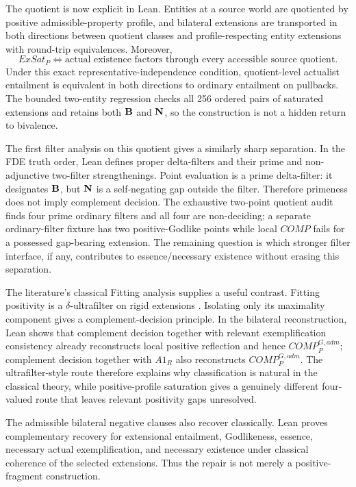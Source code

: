 The quotient is now explicit in Lean. Entities at a source world are quotiented by positive admissible-property profile, and bilateral extensions are transported in both directions between quotient classes and profile-respecting entity extensions with round-trip equivalences. Moreover,
\[
  ExSat_P
  \Longleftrightarrow
  \text{actual existence factors through every accessible source quotient}.
\]
Under this exact representative-independence condition, quotient-level actualist entailment is equivalent in both directions to ordinary entailment on pullbacks. The bounded two-entity regression checks all 256 ordered pairs of saturated extensions and retains both \(\mathbf{B}\) and \(\mathbf{N}\), so the construction is not a hidden return to bivalence.

The first filter analysis on this quotient gives a similarly sharp separation. In the FDE truth order, Lean defines proper delta-filters and their prime and non-adjunctive two-filter strengthenings. Point evaluation is a prime delta-filter: it designates \(\mathbf{B}\), but \(\mathbf{N}\) is a self-negating gap outside the filter. Therefore primeness does not imply complement decision. The exhaustive two-point quotient audit finds four prime ordinary filters and all four are non-deciding; a separate ordinary-filter fixture has two positive-Godlike points while local \(COMP\) fails for a possessed gap-bearing extension. The remaining question is which stronger filter interface, if any, contributes to essence/necessary existence without erasing this separation.

The literature's classical Fitting analysis supplies a useful contrast. Fitting positivity is a \(\delta\)-ultrafilter on rigid extensions \cite{BenzmuellerFuenmayor2019}. Isolating only its maximality component gives a complement-decision principle. In the bilateral reconstruction, Lean shows that complement decision together with relevant exemplification consistency already reconstructs local positive reflection and hence \(COMP_P^{G,adm}\); complement decision together with \(A1_R\) also reconstructs \(COMP_P^{G,adm}\). The ultrafilter-style route therefore explains why classification is natural in the classical theory, while positive-profile saturation gives a genuinely different four-valued route that leaves relevant positivity gaps unresolved.

The admissible bilateral negative clauses also recover classically. Lean proves complementary recovery for extensional entailment, Godlikeness, essence, necessary actual exemplification, and necessary existence under classical coherence of the selected extensions. Thus the repair is not merely a positive-fragment construction.

